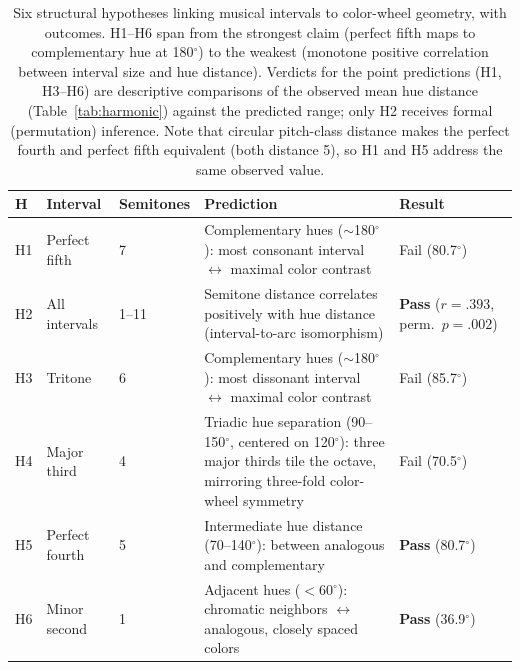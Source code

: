 \documentclass[12pt]{article}
\begin{document}
\begin{table}[htbp]
\centering
\caption{Six structural hypotheses linking musical intervals to
color-wheel geometry, with outcomes. H1--H6 span from the strongest
claim (perfect fifth maps to complementary hue at 180$^\circ$) to the
weakest (monotone positive correlation between interval size and hue
distance). Verdicts for the point predictions (H1, H3--H6) are
descriptive comparisons of the observed mean hue distance
(Table~\ref{tab:harmonic}) against the predicted range; only H2
receives formal (permutation) inference. Note that circular
pitch-class distance makes the perfect fourth and perfect fifth
equivalent (both distance 5), so H1 and H5 address the same observed
value.}
\label{tab:structural_h}
\begin{tabular}{@{}p{0.5cm}p{2.5cm}p{1.6cm}p{5.2cm}p{2.8cm}@{}}
\toprule
\textbf{H} & \textbf{Interval} & \textbf{Semitones} &
  \textbf{Prediction} & \textbf{Result} \\
\midrule
H1 & Perfect fifth  & 7     & Complementary hues ($\sim$180$^\circ$):
  most consonant interval $\leftrightarrow$ maximal color contrast
  & Fail (80.7$^\circ$) \\
H2 & All intervals  & 1--11 & Semitone distance correlates positively
  with hue distance (interval-to-arc isomorphism)
  & \textbf{Pass} ($r = .393$, perm.\ $p = .002$) \\
H3 & Tritone        & 6     & Complementary hues ($\sim$180$^\circ$):
  most dissonant interval $\leftrightarrow$ maximal color contrast
  & Fail (85.7$^\circ$) \\
H4 & Major third    & 4     & Triadic hue separation (90--150$^\circ$,
  centered on 120$^\circ$): three major thirds tile the octave,
  mirroring three-fold color-wheel symmetry & Fail (70.5$^\circ$) \\
H5 & Perfect fourth & 5     & Intermediate hue distance
  (70--140$^\circ$): between analogous and complementary
  & \textbf{Pass} (80.7$^\circ$) \\
H6 & Minor second   & 1     & Adjacent hues ($<$60$^\circ$): chromatic
  neighbors $\leftrightarrow$ analogous, closely spaced colors
  & \textbf{Pass} (36.9$^\circ$) \\
\bottomrule
\end{tabular}
\end{table}
\end{document}
